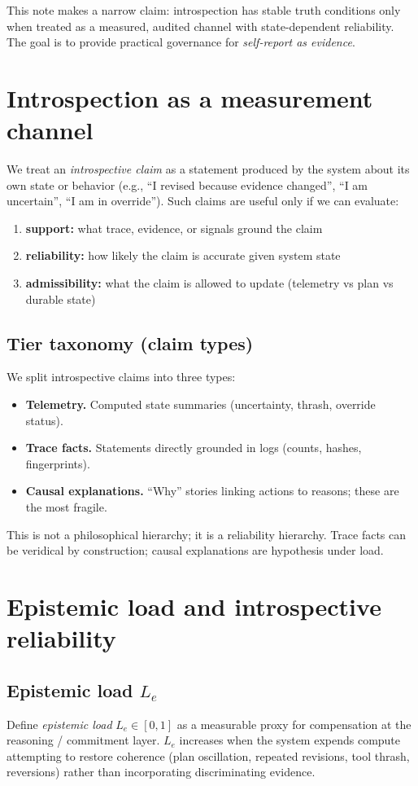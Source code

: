 \documentclass[11pt]{article}
\begin{document}
This note makes a narrow claim: introspection has stable truth conditions only when treated as a measured,
audited channel with state-dependent reliability. The goal is to provide practical governance for
\emph{self-report as evidence}.

\section{Introspection as a measurement channel}
We treat an \emph{introspective claim} as a statement produced by the system about its own state or
behavior (e.g., \enquote{I revised because evidence changed}, \enquote{I am uncertain}, \enquote{I am in
override}). Such claims are useful only if we can evaluate:
\begin{enumerate}[label=(\alph*)]
  \item \textbf{support:} what trace, evidence, or signals ground the claim
  \item \textbf{reliability:} how likely the claim is accurate given system state
  \item \textbf{admissibility:} what the claim is allowed to update (telemetry vs plan vs durable state)
\end{enumerate}

\subsection{Tier taxonomy (claim types)}
We split introspective claims into three types:
\begin{itemize}[leftmargin=2.0em]
  \item \textbf{Telemetry.} Computed state summaries (uncertainty, thrash, override status).
  \item \textbf{Trace facts.} Statements directly grounded in logs (counts, hashes, fingerprints).
  \item \textbf{Causal explanations.} \enquote{Why} stories linking actions to reasons; these are the most fragile.
\end{itemize}

This is not a philosophical hierarchy; it is a reliability hierarchy. Trace facts can be veridical by
construction; causal explanations are hypothesis under load.

\section{Epistemic load and introspective reliability}
\subsection{Epistemic load $L_e$}
Define \emph{epistemic load} $L_e \in [0,1]$ as a measurable proxy for compensation at the reasoning /
commitment layer. $L_e$ increases when the system expends compute attempting to restore coherence (plan
oscillation, repeated revisions, tool thrash, reversions) rather than incorporating discriminating evidence.
\end{document}
